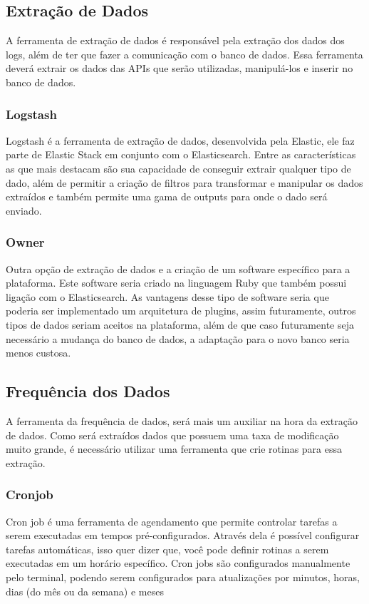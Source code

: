 \subsection*{Extração de Dados}
A ferramenta de extração de dados é responsável pela extração dos dados dos logs, além de ter que fazer a comunicação com o banco de dados. Essa ferramenta deverá extrair os dados das APIs que serão utilizadas, manipulá-los e inserir no banco de dados.
\subsubsection*{Logstash}
Logstash é a ferramenta de extração de dados, desenvolvida pela Elastic, ele faz parte de Elastic Stack em conjunto com o Elasticsearch. Entre as características as que mais destacam são sua capacidade de conseguir extrair qualquer tipo de dado, além de permitir a criação de filtros para transformar e manipular os dados extraídos e também permite uma gama de outputs para onde o dado será enviado\cite{logstash}.
\subsubsection*{Owner}
Outra opção de extração de dados e a criação de um software específico para a plataforma. Este software seria criado na linguagem Ruby que também possui ligação com o Elasticsearch. As vantagens desse tipo de software seria que poderia ser implementado um arquitetura de plugins, assim futuramente, outros tipos de dados seriam aceitos na plataforma, além de que caso futuramente seja necessário a mudança do banco de dados, a adaptação para o novo banco seria menos custosa.
\subsection*{Frequência dos Dados}
A ferramenta da frequência de dados, será mais um auxiliar na hora da extração de dados. Como será extraídos dados que possuem uma taxa de modificação muito grande, é necessário utilizar uma ferramenta que crie rotinas para essa extração.
\subsubsection*{Cronjob}
Cron job é uma ferramenta de agendamento que permite controlar tarefas a serem executadas em tempos pré-configurados. Através dela é possível configurar tarefas automáticas, isso quer dizer que, você pode definir rotinas a serem executadas em um horário específico. Cron jobs são configurados manualmente pelo terminal, podendo serem configurados para atualizações por minutos, horas, dias (do mês ou da semana) e meses
